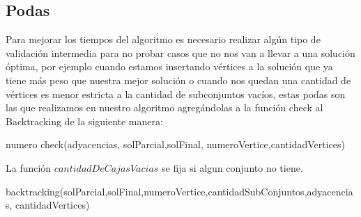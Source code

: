 \subsection{Podas}

Para mejorar los tiempos del algoritmo es necesario realizar algún tipo de validación intermedia para no probar casos que no nos van a llevar a una solución óptima, por ejemplo cuando estamos insertando vértices a la solución que ya tiene más peso que nuestra mejor solución o cuando nos quedan una cantidad de vértices es menor estricta a la cantidad de subconjuntos vacíos, estas podas son las que realizamos en nuestro algoritmo agregándolas a la función check al Backtracking de la siguiente manera:

\begin{algorithm}
  \begin{algorithmic}[1]\parskip=1mm
 \caption{numero check(adyacencias, solParcial,solFinal, numeroVertice,cantidadVertices)}
  \end{algorithmic}
  \end{algorithm}

La función $cantidadDeCajasVacias$ se fija si algun conjunto no tiene.
 
 \begin{algorithm}
 \begin{algorithmic}[1]\parskip=1mm
 \caption{backtracking(solParcial,solFinal,numeroVertice,cantidadSubConjuntos,adyacencias, cantidadVertices)}
  \end{algorithmic}
  \end{algorithm}

